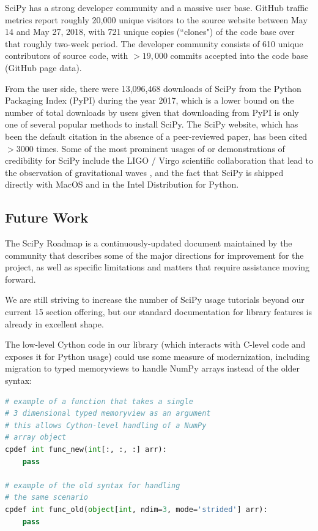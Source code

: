 \documentclass[fleqn,10pt]{wlscirep}
\begin{document}
SciPy has a strong developer community and a massive user base. GitHub traffic
metrics report roughly 20,000 unique visitors to the source website between May
14 and May 27, 2018, with 721 unique copies (``clones") of the code base over
that roughly two-week period. The developer community consists of 610 unique
contributors of source code, with $>19,000$ commits accepted into the code base
(GitHub page data).

From the user side, there were 13,096,468 downloads of SciPy from the Python
Packaging Index (PyPI) during the year 2017\cite{pypinfo}, which is a lower
bound on the number of total downloads by users given that downloading from
PyPI is only one of several popular methods to install SciPy.  The SciPy
website\cite{SciPylib}, which has been the default citation in the absence of a
peer-reviewed paper, has been cited $>3000$ times. Some of the most prominent
usages of or demonstrations of credibility for SciPy include the LIGO / Virgo
scientific collaboration that lead to the observation of gravitational waves
\cite{PhysRevLett.116.061102}, and the fact that SciPy is shipped directly with
MacOS and in the Intel Distribution for Python\cite{intel-python}. 

\subsection*{Future Work}

The SciPy Roadmap\cite{SciPy_roadmap} is a continuously-updated document
maintained by the community that describes some of the major directions for
improvement for the project, as well as specific limitations and matters that
require assistance moving forward.

We are still striving to increase the number of SciPy usage tutorials beyond
our current 15 section offering\cite{SciPy_tutorials}, but our standard
documentation for library features is already in excellent shape.

The low-level Cython code in our library (which interacts with C-level code and
exposes it for Python usage) could use some measure of modernization, including
migration to typed memoryviews to handle NumPy arrays instead of the older
syntax:

\begin{lstlisting}[language=Python]
# example of a function that takes a single
# 3 dimensional typed memoryview as an argument
# this allows Cython-level handling of a NumPy
# array object
cpdef int func_new(int[:, :, :] arr):
    pass

# example of the old syntax for handling
# the same scenario
cpdef int func_old(object[int, ndim=3, mode='strided'] arr):
    pass
\end{lstlisting}
\end{document}
